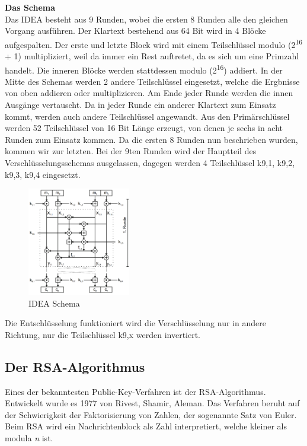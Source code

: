 \documentclass[11pt]{scrartcl}
\begin{document}
\noindent \textbf{Das Schema}\\
Das IDEA besteht aus 9 Runden, wobei die ersten 8 Runden alle den gleichen Vorgang ausführen. Der Klartext bestehend aus 64 Bit wird in 4 Blöcke aufgespalten. Der erste und letzte Block wird mit einem Teilschlüssel modulo (2\textsuperscript{16} + 1) multipliziert, weil da immer ein Rest auftretet, da es sich um eine Primzahl handelt. Die inneren Blöcke werden stattdessen modulo (2\textsuperscript{16}) addiert. In der Mitte des Schemas werden 2 andere Teilschlüssel eingesetzt, welche die Ergbnisse von oben addieren oder multiplizieren. Am Ende jeder Runde werden die innen Ausgänge vertauscht. Da in jeder Runde ein anderer Klartext zum Einsatz kommt, werden auch andere Teilschlüssel angewandt. \grqq{} Aus den Primärschlüssel werden 52 Teilschlüssel von 16 Bit Länge erzeugt, von denen je sechs in acht Runden zum Einsatz kommen.\grqq{}\citep{6}
Da die ersten 8 Runden nun beschrieben wurden, kommen wir zur letzten. Bei der 9ten Runden wird der Hauptteil des Verschlüsselungsschemas ausgelassen, dagegen werden 4 Teilschlüssel k{\scriptsize 9,1}, k{\scriptsize 9,2}, k{\scriptsize 9,3}, k{\scriptsize 9,4} eingesetzt.\citep{3}\citep{6}
\begin{figure}[H]
\includegraphics[width=0.40\textwidth]{Bilder/IDEA/IDEA_Schema}
	\caption{IDEA Schema \citep{3}}
	\label{fig11}
\end{figure}
\noindent
Die Entschlüsselung funktioniert wird die Verschlüsselung nur in andere Richtung, nur die Teilschlüssel k{\scriptsize 9,x} werden invertiert. \citep{3}

\subsection{Der RSA-Algorithmus}
\label{sec:rsa-algorithmus}
Eines der bekanntesten Public-Key-Verfahren ist der RSA-Algorithmus. Entwickelt wurde es 1977 von Rivest, Shamir, Aleman. Das Verfahren beruht auf der Schwierigkeit der Faktorisierung von Zahlen, der sogenannte Satz von Euler. Beim RSA wird ein Nachrichtenblock als Zahl interpretiert, welche kleiner als modula \textit{n} ist. \citep{2}
\end{document}
